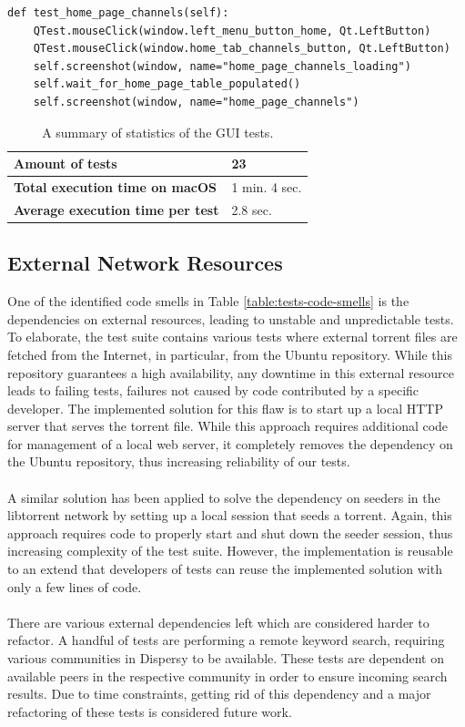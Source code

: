 \begin{lstlisting}[caption={An example of a test that tests the new Qt Tribler GUI.},label={lst:qtest-sample}]
def test_home_page_channels(self):
	QTest.mouseClick(window.left_menu_button_home, Qt.LeftButton)
	QTest.mouseClick(window.home_tab_channels_button, Qt.LeftButton)
	self.screenshot(window, name="home_page_channels_loading")
	self.wait_for_home_page_table_populated()
	self.screenshot(window, name="home_page_channels")
\end{lstlisting}

\begin{table}[h!]
	\centering
	\begin{tabular}{|l|l|}
		\hline
		\textbf{Amount of tests} & 23 \\ \hline
		\textbf{Total execution time on macOS} & 1 min. 4 sec. \\ \hline
		\textbf{Average execution time per test} & 2.8 sec.\\ \hline
	\end{tabular}
	\caption{A summary of statistics of the GUI tests.}
	\label{table:gui-tests-summary}
\end{table}

\subsection{External Network Resources}
\label{subsec:external-network-resources}
One of the identified code smells in Table \ref{table:tests-code-smells} is the dependencies on external resources, leading to unstable and unpredictable tests. To elaborate, the test suite contains various tests where external torrent files are fetched from the Internet, in particular, from the Ubuntu repository. While this repository guarantees a high availability, any downtime in this external resource leads to failing tests, failures not caused by code contributed by a specific developer. The implemented solution for this flaw is to start up a local HTTP server that serves the torrent file. While this approach requires additional code for management of a local web server, it completely removes the dependency on the Ubuntu repository, thus increasing reliability of our tests.\\\\
A similar solution has been applied to solve the dependency on seeders in the libtorrent network by setting up a local session that seeds a torrent. Again, this approach requires code to properly start and shut down the seeder session, thus increasing complexity of the test suite. However, the implementation is reusable to an extend that developers of tests can reuse the implemented solution with only a few lines of code.\\\\
There are various external dependencies left which are considered harder to refactor. A handful of tests are performing a remote keyword search, requiring various communities in Dispersy to be available. These tests are dependent on available peers in the respective community in order to ensure incoming search results. Due to time constraints, getting rid of this dependency and a major refactoring of these tests is considered future work.

